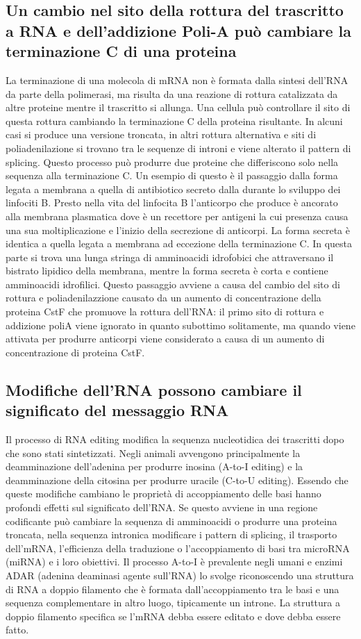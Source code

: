 \subsection{Un cambio nel sito della rottura del trascritto a RNA e dell'addizione Poli-A pu\`o cambiare la terminazione C di una proteina}
La terminazione di una molecola di mRNA non \`e formata dalla sintesi dell'RNA da parte della polimerasi, ma risulta da una reazione di rottura catalizzata da altre proteine mentre il 
trascritto si allunga. Una cellula pu\`o controllare il sito di questa rottura cambiando la terminazione C della proteina risultante. In alcuni casi si produce una versione troncata, 
in altri rottura alternativa e siti di poliadenilazione si trovano tra le sequenze di introni e viene alterato il pattern di splicing. Questo processo pu\`o produrre due proteine che
differiscono solo nella sequenza alla terminazione C. Un esempio di questo \`e il passaggio dalla forma legata a membrana a quella di antibiotico secreto dalla durante lo sviluppo dei 
linfociti B. Presto nella vita del linfocita B l'anticorpo che produce \`e ancorato alla membrana plasmatica dove \`e un recettore per antigeni la cui presenza causa una sua 
moltiplicazione e l'inizio della secrezione di anticorpi. La forma secreta \`e identica a quella legata a membrana ad eccezione della terminazione C. In questa parte si trova una
lunga stringa di amminoacidi idrofobici che attraversano il bistrato lipidico della membrana, mentre la forma secreta \`e corta e contiene amminoacidi idrofilici. Questo passaggio
avviene a causa del cambio del sito di rottura e poliadenilazzione causato da un aumento di concentrazione della proteina CstF che promuove la rottura dell'RNA: il primo sito di 
rottura e addizione poliA viene ignorato in quanto subottimo solitamente, ma quando viene attivata per produrre anticorpi viene considerato a causa di un aumento di concentrazione di 
proteina CstF.
\subsection{Modifiche dell'RNA possono cambiare il significato del messaggio RNA}
Il processo di RNA editing modifica la sequenza nucleotidica dei trascritti dopo che sono stati sintetizzati. Negli animali avvengono principalmente la deamminazione dell'adenina per
produrre inosina (A-to-I editing) e la deamminazione della citosina per produrre uracile (C-to-U editing). Essendo che queste modifiche cambiano le propriet\`a di accoppiamento delle
basi hanno profondi effetti sul significato dell'RNA. Se questo avviene in una regione codificante pu\`o cambiare la sequenza di amminoacidi o produrre una proteina troncata, nella 
sequenza intronica modificare i pattern di splicing, il trasporto dell'mRNA, l'efficienza della traduzione o l'accoppiamento di basi tra microRNA (miRNA) e i loro obiettivi. Il processo
A-to-I \`e prevalente negli umani e enzimi ADAR (adenina deaminasi agente sull'RNA) lo svolge riconoscendo una struttura di RNA a doppio filamento che \`e formata dall'accoppiamento tra 
le basi e una sequenza complementare in altro luogo, tipicamente un introne. La struttura a doppio filamento specifica se l'mRNA debba essere editato e dove debba essere fatto. 
